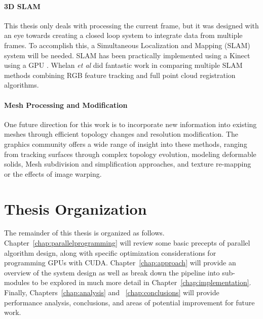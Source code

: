 \paragraph{3D SLAM}
This thesis only deals with processing the current frame, but it was designed with an eye towards creating a closed loop system to integrate data from multiple frames. To accomplish this, a Simultaneous Localization and Mapping (SLAM) system will be needed. SLAM has been practically implemented using a Kinect using a GPU \cite{quadrocopterslam,steinbrucker2011real}. Whelan \textit{et al} did fantastic work in comparing multiple SLAM methods combining RGB feature tracking and full point cloud registration algorithms\cite{whelan:odometry}.
\paragraph{Mesh Processing and Modification}
One future direction for this work is to incorporate new information into existing meshes through efficient topology changes and resolution modification. The graphics community offers a wide range of insight into these methods, ranging from tracking surfaces through complex topology evolution\cite{bojsen2012tracking}, modeling deformable solids\cite{Sifakis:2007:HSO}, Mesh subdivision and simplification approaches\cite{Puppo:2009:RS}, and texture re-mapping or the effects of image warping\cite{heckbert,heckbert:pixarsurvey,wang:optimaltexture,Oka:RealtimeManipulation,Guo:2008:MOR}.
\section{Thesis Organization} %
The remainder of this thesis is organized as follows. Chapter~\ref{chap:parallelprogramming} will review some basic precepts of parallel algorithm design, along with specific optimization considerations for programming GPUs with CUDA. Chapter~\ref{chap:approach} will provide an overview of the system design as well as break down the pipeline into sub-modules to be explored in much more detail in Chapter~\ref{chap:implementation}. Finally, Chapters~\ref{chap:analysis} and ~\ref{chap:conclusions} will provide performance analysis, conclusions, and areas of potential improvement for future work.